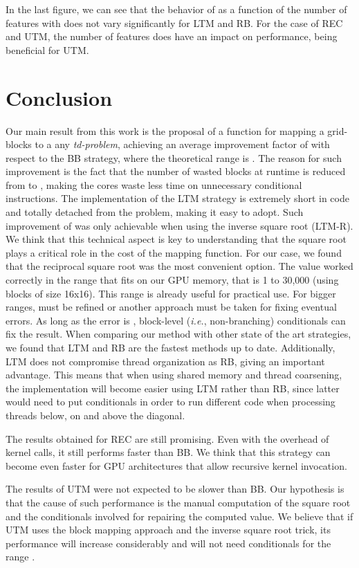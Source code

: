 \documentclass[conference]{IEEEtran}
\begin{document}
In the last figure, we can see that the behavior of  as a function of the number of features with  does not vary significantly for LTM and RB. 
For the case of REC and UTM, the number of features does have an impact on performance, being beneficial for UTM.


\section{Conclusion}
\label{sec_conclusions}
Our main result from this work is the proposal of a function  for mapping a grid-blocks to a any \textit{td-problem}, 
achieving an average improvement factor of  with respect to the BB strategy, where the theoretical range is . 
The reason for such improvement is the fact that the number of wasted blocks at runtime is reduced from 
 to , making the cores waste less time on unnecessary conditional instructions. 
The implementation of the LTM strategy is extremely short in code and totally detached from the problem, making it easy to adopt.
Such improvement of  was only achievable when using the inverse square root (LTM-R). We think that this technical aspect is key 
to understanding that the square root plays a critical role in the cost of the mapping function. For our case, we found that the reciprocal square root was the most convenient option. 
The  value worked correctly in the range that fits on our GPU memory, that is 1 to 30,000 (using blocks of size 16x16). 
This range is already useful for practical use. For bigger ranges,  must be refined or another approach must be taken 
for fixing eventual errors. As long as the error is , block-level (\textit{i.e.}, non-branching) conditionals can fix the result.
When comparing our method with other state of the art strategies, we found that LTM and RB are the fastest methods up to date. Additionally, LTM does not compromise thread organization as RB, giving an 
important advantage. This means that when using shared memory and thread coarsening, the implementation will become easier using LTM rather than RB, since latter would need to 
put conditionals in order to run different code when processing threads below, on and above the diagonal.

The results obtained for REC are still promising. Even with the overhead of  kernel calls, it still performs faster than BB. We think that this strategy can become even faster for GPU architectures that 
allow recursive kernel invocation. 

The results of UTM were not expected to be slower than BB. Our hypothesis is that the cause of such performance is the manual computation of the square root and the 
conditionals involved for repairing the computed value. We believe that if UTM uses the block mapping approach and the inverse square root trick, its performance will increase considerably 
and will not need conditionals for the range .
\end{document}
